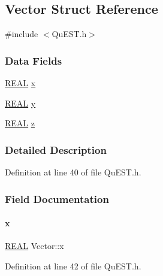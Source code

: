 \hypertarget{structVector}{}\subsection{Vector Struct Reference}
\label{structVector}


{\ttfamily \#include $<$Qu\+E\+S\+T.\+h$>$}

\subsubsection*{Data Fields}
\begin{DoxyCompactItemize}
\item 
\mbox{\hyperlink{QuEST__precision_8h_a4b654506f18b8bfd61ad2a29a7e38c25}{R\+E\+AL}} \mbox{\hyperlink{structVector_aac7abe171ba4bada50ed72acba6259fc}{x}}
\item 
\mbox{\hyperlink{QuEST__precision_8h_a4b654506f18b8bfd61ad2a29a7e38c25}{R\+E\+AL}} \mbox{\hyperlink{structVector_a375ca805d4c808a53d7c4e0c737ae3de}{y}}
\item 
\mbox{\hyperlink{QuEST__precision_8h_a4b654506f18b8bfd61ad2a29a7e38c25}{R\+E\+AL}} \mbox{\hyperlink{structVector_ad4e863651be7d6b7e2b28cd7445a0ccf}{z}}
\end{DoxyCompactItemize}


\subsubsection{Detailed Description}


Definition at line 40 of file Qu\+E\+S\+T.\+h.



\subsubsection{Field Documentation}
\mbox{\label{structVector_aac7abe171ba4bada50ed72acba6259fc}} 
\paragraph{\texorpdfstring{x}{x}}
{\footnotesize\ttfamily \mbox{\hyperlink{QuEST__precision_8h_a4b654506f18b8bfd61ad2a29a7e38c25}{R\+E\+AL}} Vector\+::x}



Definition at line 42 of file Qu\+E\+S\+T.\+h.



